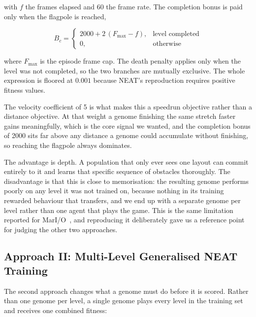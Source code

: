 \noindent
with $f$ the frames elapsed and 60 the frame rate. The completion bonus is
paid only when the flagpole is reached,

\begin{equation}
    B_{c} =
    \begin{cases}
        2000 + 2\,(F_{\max} - f), & \text{level completed} \\
        0, & \text{otherwise}
    \end{cases}
    \label{eq:completion-level}
\end{equation}

\noindent
where $F_{\max}$ is the episode frame cap. The death penalty applies only when
the level was not completed, so the two branches are mutually exclusive. The
whole expression is floored at $0.001$ because NEAT's reproduction requires
positive fitness values.

\noindent
The velocity coefficient of 5 is what makes this a speedrun objective rather
than a distance objective. At that weight a genome finishing the same stretch
faster gains meaningfully, which is the core signal we wanted, and the
completion bonus of 2000 sits far above any distance a genome could accumulate
without finishing, so reaching the flagpole always dominates.

\noindent
The advantage is depth. A population that only ever sees one layout can commit
entirely to it and learns that specific sequence of obstacles thoroughly. The
disadvantage is that this is close to memorisation: the resulting genome
performs poorly on any level it was not trained on, because nothing in its
training rewarded behaviour that transfers, and we end up with a separate
genome per level rather than one agent that plays the game. This is the same
limitation reported for MarI/O~\cite{sethbling2015}, and reproducing it
deliberately gave us a reference point for judging the other two approaches.

\subsection{Approach II: Multi-Level Generalised NEAT Training}
\label{subsec:approach-multilevel}

The second approach changes what a genome must do before it is scored. Rather
than one genome per level, a single genome plays every level in the training
set and receives one combined fitness:

